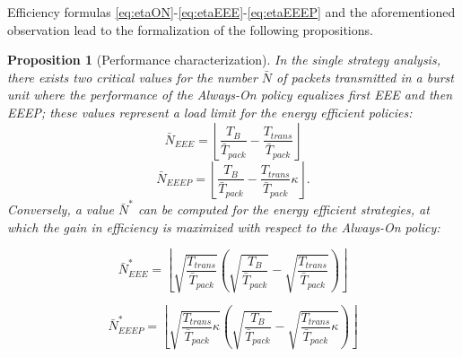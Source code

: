 \documentclass[journal,10pt,twoside,final]{IEEEtran}
\newtheorem{proposition}{Proposition}
\begin{document}
Efficiency formulas \eqref{eq:etaON}-\eqref{eq:etaEEE}-\eqref{eq:etaEEEP} and the aforementioned observation lead to the formalization of the following propositions.
\begin{proposition} [Performance characterization] In the single strategy analysis, there exists two critical values for the number $\bar{N}$ of packets transmitted in a burst unit where the performance of the Always-On policy equalizes first EEE and then EEEP; 
these values represent a load limit for the energy efficient policies:
\begin{equation}
\bar{N}_{EEE} = \left\lfloor\frac{T_B}{\bar{T}_{pack}}-\frac{T_{trans}}{\bar{T}_{pack}}\right\rfloor
\label{eq:EEEloadlimit}
\end{equation}
\begin{equation}
\bar{N}_{EEEP} = \left\lfloor\frac{T_B}{\bar{T}_{pack}} -\frac{T_{trans}}{\bar{T}_{pack}}\kappa\right\rfloor.
\label{eq:EEEPloadlimit}
\end{equation}
Conversely, a value $\bar{N}^\ast$ can be computed for the energy efficient strategies, at which the gain in efficiency is maximized with respect to the Always-On policy: 

\begin{equation}
\bar{N}^\ast_{EEE} = \left\lfloor\sqrt{\frac{T_{trans}}{\bar{T}_{pack}}} \left(\sqrt{\frac{T_B}{\bar{T}_{pack}}} - \sqrt{\frac{T_{trans}}{\bar{T}_{pack}}} \right)\right\rfloor
\label{eq:EEEoptimal}
\end{equation}

\begin{equation}
\bar{N}^\ast_{EEEP} = \left\lfloor\sqrt{\frac{T_{trans}}{\bar{T}_{pack}}\kappa} \left(\sqrt{\frac{T_B}{\bar{T}_{pack}}} - \sqrt{\frac{T_{trans}}{\bar{T}_{pack}}\kappa} \right)\right\rfloor
\label{eq:EEEPoptimal}
\end{equation}
\label{prop:prop1}
\end{proposition}
\end{document}
